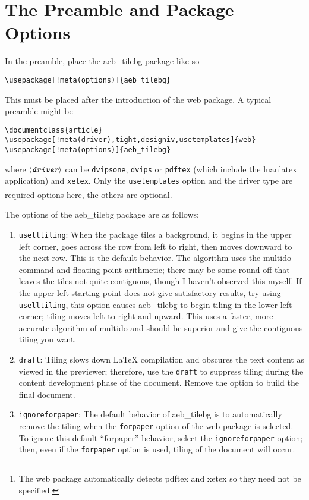 \documentclass{article}
\def\meta#1{$\langle\textit{\texttt{#1}}\rangle$}
\let\pkg\textsf
\let\amtIndent\leftmargini
\begin{document}
\section{The Preamble and Package Options}

In the preamble, place the \textsf{aeb\_tilebg} package like so
\begin{Verbatim}[xleftmargin=\amtIndent,fontsize=\small,commandchars=!()]
\usepackage[!meta(options)]{aeb_tilebg}
\end{Verbatim}
This must be placed after the introduction of the web package. A
typical preamble might be
\begin{Verbatim}[xleftmargin=\amtIndent,fontsize=\small,commandchars=!()]
\documentclass{article}
\usepackage[!meta(driver),tight,designiv,usetemplates]{web}
\usepackage[!meta(options)]{aeb_tilebg}
\end{Verbatim}
where \meta{driver} can be \texttt{dvipsone}, \texttt{dvips} or
\texttt{pdftex} (which include the \textsf{luanlatex} application) and
\texttt{xetex}. Only the \texttt{usetemplates} option and the driver type
are required options here, the others are optional.\footnote{The \textsf{web} package
automatically detects \textsf{pdftex} and \textsf{xetex} so they need not be specified.}

The options of the \textsf{aeb\_tilebg} package are as follows:
\begin{enumerate}
\item \texttt{uselltiling}: When the package tiles a background, it
begins in the upper left corner, goes across the row from left to
right, then moves downward to the next row. This is the default
behavior. The algorithm uses the multido command and floating point
arithmetic; there may be some round off that leaves the tiles not
quite contiguous, though I haven't observed this myself. If the
upper-left starting point does not give satisfactory results, try
using \texttt{uselltiling}, this option causes \textsf{aeb\_tilebg}
to begin tiling in the lower-left corner; tiling moves left-to-right
and upward.  This uses a faster, more accurate algorithm of multido
and should be superior and give the contiguous tiling you want.
\item \texttt{draft}: Tiling slows down {\LaTeX} compilation and
obscures the text content as viewed in the previewer; therefore, use
the \texttt{draft} to suppress tiling during the content development
phase of the document.  Remove the option to build the final
document.
\item \texttt{ignoreforpaper}: The default behavior of
\textsf{aeb\_tilebg} is to automatically remove the tiling when the
\texttt{forpaper} option of the \pkg{web} package is selected. To
ignore this default ``forpaper'' behavior, select the
\texttt{ignoreforpaper} option; then, even if the \texttt{forpaper}
option is used, tiling of the document will occur.
\end{enumerate}
\end{document}
